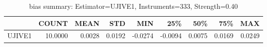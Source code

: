 \begin{table}[ht]
\centering
\caption{bias summary: Estimator=UJIVE1, Instruments=333, Strength=0.40}
\begin{tabular}{lrrrrrrrr}
\toprule
 & COUNT & MEAN & STD & MIN & 25\% & 50\% & 75\% & MAX \\
\midrule
UJIVE1 & 10.0000 & 0.0028 & 0.0192 & -0.0274 & -0.0094 & 0.0075 & 0.0169 & 0.0249 \\
\bottomrule
\end{tabular}
\end{table}
